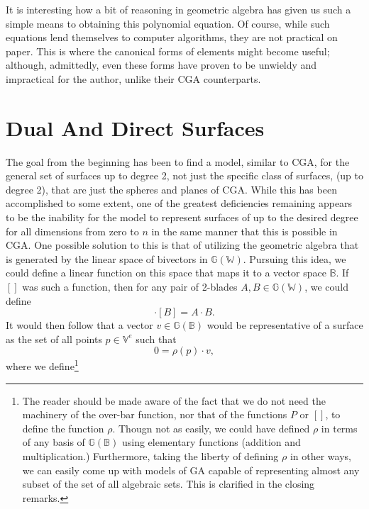 \documentclass{birkjour}
\theoremstyle{definition}
\theoremstyle{remark}
\numberwithin{equation}{section}
\newcommand{\G}{\mathbb{G}}
\newcommand{\V}{\mathbb{V}}
\newcommand{\W}{\mathbb{W}}
\newcommand{\B}{\mathbb{B}}
\begin{document}
It is interesting how a bit of reasoning in geometric algebra has given us such a simple means
to obtaining this polynomial equation.
Of course, while such equations lend themselves to computer algorithms, they
are not practical on paper.  This is where the canonical forms of elements might become
useful; although, admittedly, even these forms have proven to be unwieldy
and impractical for the author, unlike their CGA counterparts.

\section{Dual And Direct Surfaces}\label{sec_deal_dir_surf}

The goal from the beginning has been to find a model, similar
to CGA, for the general set of surfaces up to degree 2,
not just the specific class of surfaces, (up to degree 2), that are just the spheres and planes of CGA.
While this has been accomplished to some extent, one of the greatest deficiencies
remaining appears to be the inability for the model to represent surfaces of up to
the desired degree for
all dimensions from zero to $n$ in the same manner that this is possible in CGA.
One possible solution to this is that of utilizing the geometric
algebra that is generated by the linear space of bivectors in $\G(\W)$.  Pursuing
this idea, we could
define a linear function on this space that maps it to a vector space $\B$.  If $[]$ was such
a function, then for any pair of 2-blades $A,B\in\G(\W)$, we could define
\begin{equation}
[A]\cdot [B]=A\cdot B.
\end{equation}
It would then follow that a vector $v\in\G(\B)$ would be
representative of a surface as the set of all points $p\in\V^e$ such that
\begin{equation}\label{equ_dual_surf_set}
0 = \rho(p)\cdot v,
\end{equation}
where we define\footnote{The reader should be made aware of the fact
that we do not need the machinery of the over-bar function, nor
that of the functions $P$ or $[]$, to
define the function $\rho$.  Thougn not as easily, we could have defined $\rho$
in terms of any basis of $\G(\B)$ using elementary functions (addition and multiplication.)
Furthermore, taking the liberty of defining
$\rho$ in other ways, we can easily come up with models of GA capable of representing
almost any subset of the set of all algebraic sets.  This is clarified in the closing remarks.}
\end{document}
